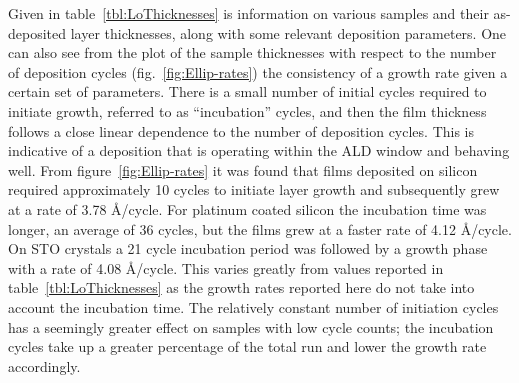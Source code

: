 Given in table~\ref{tbl:LoThicknesses} is information on various samples and their as-deposited layer thicknesses, along with some relevant deposition parameters. One can also see from the plot of the sample thicknesses with respect to the number of deposition cycles (fig.~\vref{fig:Ellip-rates}) the consistency of a growth rate given a certain set of parameters. There is a small number of initial cycles required to initiate growth, referred to as ``incubation'' cycles, and then the film thickness follows a close linear dependence to the number of deposition cycles. This is indicative of a deposition that is operating within the ALD window and behaving well. From figure~\ref{fig:Ellip-rates} it was found that films deposited on silicon required approximately 10 cycles to initiate layer growth and subsequently grew at a rate of 3.78 \AA/cycle. For platinum coated silicon the incubation time was longer, an average of 36 cycles, but the films grew at a faster rate of 4.12 \AA/cycle. On STO crystals a 21 cycle incubation period was followed by a growth phase with a rate of 4.08 \AA/cycle. This varies greatly from values reported in table~\ref{tbl:LoThicknesses} as the growth rates reported here do not take into account the incubation time. The relatively constant number of initiation cycles has a seemingly greater effect on samples with low cycle counts; the incubation cycles take up a greater percentage of the total run and lower the growth rate accordingly. 

